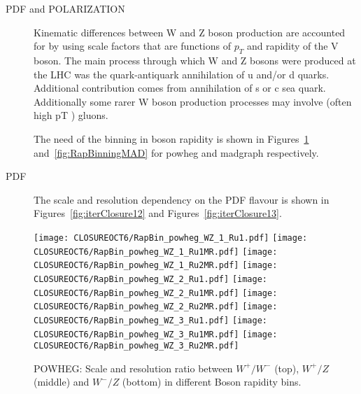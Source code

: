 \documentclass[41pt,a4paper,oneside]{report}
\begin{document}
\begin{description}
\item[PDF and POLARIZATION] Kinematic differences between W and Z boson production are accounted for by using scale factors that are functions of $p_{T}$ and rapidity of the V boson. 
The main process through which W and Z bosons were produced at the LHC was the quark-antiquark annihilation of u and/or d quarks.
Additional contribution comes from annihilation of s or c sea quark.
Additionally some rarer W boson production processes may involve (often high pT ) gluons.


The need of the binning in boson rapidity is shown in Figures~\ref{fig:RapBinningPOW} and~\ref{fig:RapBinningMAD} for powheg and madgraph respectively.

\item[PDF] The scale and resolution dependency on the PDF flavour is shown in Figures~\ref{fig:iterClosure12} and Figures~\ref{fig:iterClosure13}. 

\end{description}

\begin{figure}[h!]
  \begin{center}
    \texttt{[image: CLOSUREOCT6/RapBin\_powheg\_WZ\_1\_Ru1.pdf]}
    \texttt{[image: CLOSUREOCT6/RapBin\_powheg\_WZ\_1\_Ru1MR.pdf]}
    \texttt{[image: CLOSUREOCT6/RapBin\_powheg\_WZ\_1\_Ru2MR.pdf]}
    \texttt{[image: CLOSUREOCT6/RapBin\_powheg\_WZ\_2\_Ru1.pdf]}
    \texttt{[image: CLOSUREOCT6/RapBin\_powheg\_WZ\_2\_Ru1MR.pdf]}
    \texttt{[image: CLOSUREOCT6/RapBin\_powheg\_WZ\_2\_Ru2MR.pdf]}
    \texttt{[image: CLOSUREOCT6/RapBin\_powheg\_WZ\_3\_Ru1.pdf]}
    \texttt{[image: CLOSUREOCT6/RapBin\_powheg\_WZ\_3\_Ru1MR.pdf]}
    \texttt{[image: CLOSUREOCT6/RapBin\_powheg\_WZ\_3\_Ru2MR.pdf]}
    \caption{POWHEG: Scale and resolution ratio between $W^{+}/W^{-}$ (top), $W^{+}/Z$ (middle) and $W^{-}/Z$ (bottom) in different Boson rapidity bins.}
    \label{fig:RapBinningPOW}
  \end{center}
\end{figure}
\end{document}
